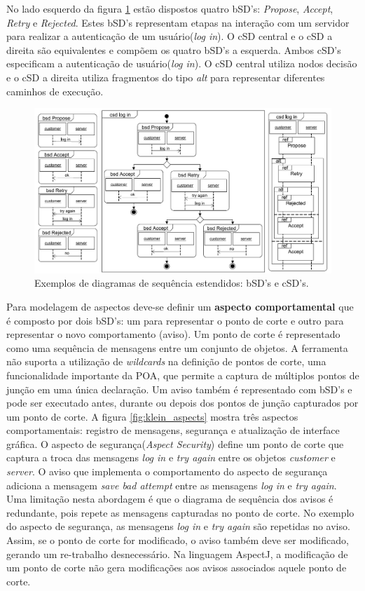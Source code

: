 No lado esquerdo da figura \ref{fig:klein_sequence_diagrams} estão dispostos quatro bSD's: \textit{Propose}, \textit{Accept}, \textit{Retry} e
\textit{Rejected}. Estes bSD's representam etapas na interação com um servidor para realizar a autenticação de um usuário(\textit{log in}). O cSD
central e o cSD a direita são equivalentes e compõem os quatro bSD's a esquerda. Ambos cSD's especificam a autenticação de usuário(\textit{log in}). O
cSD central utiliza nodos decisão e o cSD a direita utiliza fragmentos do tipo \textit{alt} para representar diferentes caminhos de execução.

\begin{figure}
	\centering
	\includegraphics[width=475px]{img/klein_sequence_diagrams.png}
	\caption{Exemplos de diagramas de sequência
	estendidos: bSD's e cSD's.}\label{fig:klein_sequence_diagrams}
\end{figure}

Para modelagem de aspectos deve-se definir um \textbf{aspecto comportamental} que é composto por dois bSD's: um para representar o ponto de corte e
outro para representar o novo comportamento (aviso). Um ponto de corte é representado como uma sequência de mensagens entre um conjunto de objetos. A
ferramenta não suporta a utilização de \textit{wildcards} na definição de pontos de corte, uma funcionalidade importante da POA, que permite a captura
de múltiplos pontos de junção em uma única declaração. Um aviso também é representado com bSD's e pode ser executado antes, durante ou depois dos
pontos de junção capturados por um ponto de corte. A figura \ref{fig:klein_aspects} mostra três aspectos comportamentais: registro de mensagens,
segurança e atualização de interface gráfica. O aspecto de segurança(\textit{Aspect Security}) define um ponto de corte que captura a troca das
mensagens \textit{log in} e \textit{try again} entre os objetos \textit{customer} e \textit{server}. O aviso que implementa o comportamento do aspecto
de segurança adiciona a mensagem \textit{save bad attempt} entre as mensagens \textit{log in} e \textit{try again}. Uma limitação nesta abordagem é
que o diagrama de sequência dos avisos é redundante, pois repete as mensagens capturadas no ponto de corte. No exemplo do aspecto de segurança, as
mensagens \textit{log in} e \textit{try again} são repetidas no aviso. Assim, se o ponto de corte for modificado, o aviso também deve ser modificado,
gerando um re-trabalho desnecessário. Na linguagem AspectJ, a modificação de um ponto de corte não gera modificações aos avisos associados aquele
ponto de corte.

